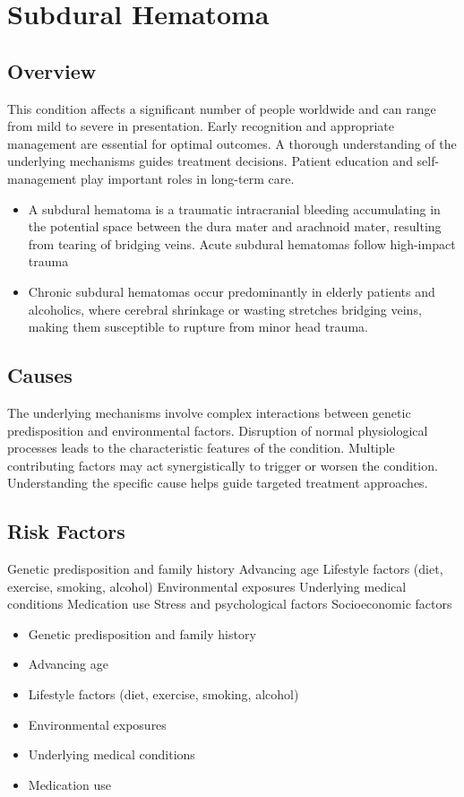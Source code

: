\chapter{Subdural Hematoma}
\label{sec:Subdural Hematoma}

\section{Overview}
This condition affects a significant number of people worldwide and can range from mild to severe in presentation. Early recognition and appropriate management are essential for optimal outcomes. A thorough understanding of the underlying mechanisms guides treatment decisions. Patient education and self-management play important roles in long-term care.

\begin{itemize}[noitemsep]
  \item A subdural hematoma is a traumatic intracranial bleeding accumulating in the potential space between the dura mater and arachnoid mater, resulting from tearing of bridging veins. Acute subdural hematomas follow high-impact trauma
  \item Chronic subdural hematomas occur predominantly in elderly patients and alcoholics, where cerebral shrinkage or wasting stretches bridging veins, making them susceptible to rupture from minor head trauma.
\end{itemize}
\section{Causes}
The underlying mechanisms involve complex interactions between genetic predisposition and environmental factors. Disruption of normal physiological processes leads to the characteristic features of the condition. Multiple contributing factors may act synergistically to trigger or worsen the condition. Understanding the specific cause helps guide targeted treatment approaches.
\section{Risk Factors}
Genetic predisposition and family history Advancing age Lifestyle factors (diet, exercise, smoking, alcohol) Environmental exposures Underlying medical conditions Medication use Stress and psychological factors Socioeconomic factors

\begin{itemize}[noitemsep]
  \item Genetic predisposition and family history
  \item Advancing age
  \item Lifestyle factors (diet, exercise, smoking, alcohol)
  \item Environmental exposures
  \item Underlying medical conditions
  \item Medication use
\end{itemize}
